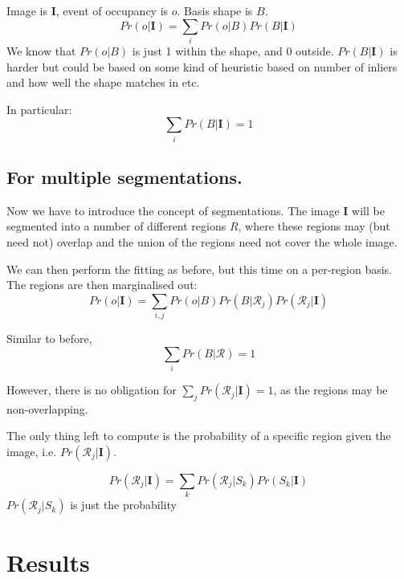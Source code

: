 \documentclass[10pt,a4paper]{article}
\newcommand{\prob}{Pr}
\newcommand{\rgbdimage}{\mathbf{I}}
\newcommand{\imregion}{\mathcal{R}}
\newcommand{\occ}{o}
\newcommand{\basisshape}{B}
\begin{document}
Image is $\rgbdimage$, event of occupancy is $o$. Basis shape is $\basisshape$.
$$
\prob(\occ | \rgbdimage) = \sum_i \prob(\occ | \basisshape) \prob(\basisshape | \rgbdimage)
$$ 
We know that $\prob(\occ|\basisshape)$ is just 1 within the shape, and 0 outside. 
$\prob(\basisshape|\rgbdimage)$ is harder but could be based on some kind of heuristic based on number of inliers and how well the shape matches in etc.

In particular:
$$ 
\sum_i \prob(\basisshape|\rgbdimage) = 1
$$

\subsection{For multiple segmentations.}

Now we have to introduce the concept of segmentations. 
The image $\rgbdimage$ will be segmented into a number of different regions $R$, where these regions may (but need not) overlap and the union of the regions need not cover the whole image.

We can then perform the fitting as before, but this time on a per-region basis. The regions are then marginalised out:
$$
\prob(\occ | \rgbdimage) = \sum_{i,j} \prob(\occ|\basisshape)\prob(\basisshape|\imregion_j)\prob(\imregion_j|\rgbdimage)
$$

Similar to before,
$$
\sum_i \prob(\basisshape|\imregion) = 1
$$

However, there is no obligation for $\sum_j \prob(\imregion_j | \rgbdimage) = 1$, as the regions may be non-overlapping.

The only thing left to compute is the probability of a specific region given the image, i.e. $\prob(\imregion_j|\rgbdimage)$. 

$$
\prob(\imregion_j | \rgbdimage) = \sum_{k} \prob(\imregion_j|S_k)\prob(S_k|\rgbdimage)
$$
$\prob(\imregion_j | S_k)$ is just the probability 


\section{Results}



%


\end{document}
